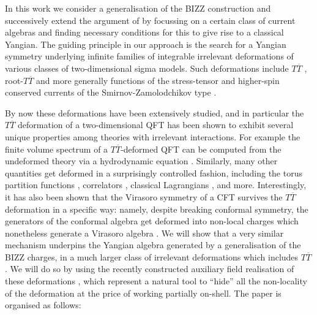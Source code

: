 \documentclass[12pt]{article}
\numberwithin{equation}{section}
\begin{document}
In this work we consider a generalisation of the BIZZ construction \cite{BREZIN1979442} and successively extend the argument of \cite{MacKay:1992he} by focussing on a certain class of current algebras and finding necessary conditions for this to give rise to a classical Yangian. The guiding principle in our approach is the search for a Yangian symmetry underlying infinite families of integrable irrelevant deformations of various classes of two-dimensional sigma models.  Such deformations include $T\overline  T $ \cite{Zamolodchikov:2004ce, Cavaglia:2016oda}, root-$T\overline  T$ \cite{Ferko:2022cix} and more generally functions of the stress-tensor and higher-spin conserved currents of the Smirnov-Zamolodchikov type \cite{Smirnov:2016lqw}.


By now these deformations have been extensively studied, and in particular the $T \overline T$ deformation of a two-dimensional QFT has been shown to exhibit several unique properties among theories with irrelevant interactions. For example the finite volume spectrum of a $T\overline T$-deformed QFT can be computed from the undeformed theory via a hydrodynamic equation \cite{Cavaglia:2016oda}. Similarly, many other quantities get deformed in a surprisingly controlled fashion, including the torus partition functions \cite{Cardy:2018sdv}, correlators \cite{Cardy:2018sdv,Li:2026ecl,Guica:2019vnb}, classical Lagrangians \cite{Cavaglia:2016oda}, and more. Interestingly, it has also been shown that the Virasoro symmetry of a CFT survives the $T\overline T$ deformation in a specific way: namely, despite breaking conformal symmetry, the generators of the conformal algebra get deformed into non-local charges which nonetheless generate a Virasoro algebra \cite{Chen:2025jzb}. We will show that a very similar mechanism underpins the Yangian algebra generated by a generalisation of the BIZZ charges, in a much larger class of irrelevant deformations which includes $T\overline T$. We will do so by using the recently constructed auxiliary field realisation of these deformations \cite{Ferko:2024ali,Bielli:2024ach,Bielli:2025uiv,Baglioni:2025tsc}, which represent a natural tool to ``hide'' all the non-locality of the deformation at the price of working partially on-shell. The paper is organised as follows:
\end{document}
